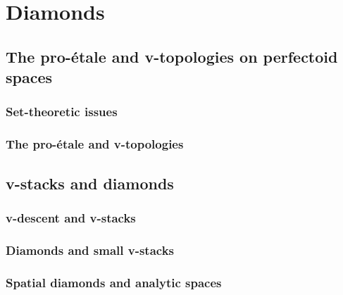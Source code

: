 \section{Diamonds}
    \subsection{The pro-\'etale and v-topologies on perfectoid spaces}
        \subsubsection{Set-theoretic issues}
        
        \subsubsection{The pro-\'etale and v-topologies}
    
    \subsection{v-stacks and diamonds}
        \subsubsection{v-descent and v-stacks}
        
        \subsubsection{Diamonds and small v-stacks}
        
        \subsubsection{Spatial diamonds and analytic spaces}